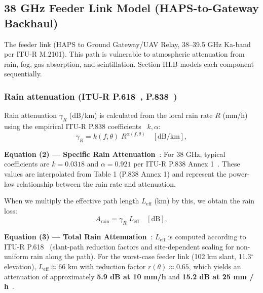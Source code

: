 \documentclass[conference]{IEEEtran}
\begin{document}
\subsection{38 GHz Feeder Link Model (HAPS-to-Gateway Backhaul)}

The feeder link (HAPS to Ground Gateway/UAV Relay, 38--39.5 GHz Ka-band per ITU-R M.2101). This path is vulnerable to atmospheric attenuation from rain, fog, gas absorption, and scintillation. Section III.B models each component sequentially.

\subsubsection{Rain attenuation (ITU-R P.618~\cite{itu_p618}, P.838~\cite{itu_p838})}
Rain attenuation $\gamma_R$ (dB/km) is calculated from the local rain
rate $R$ (mm/h) using the empirical ITU-R P.838 coefficients~\cite{itu_p838} $k,\alpha$:
\begin{equation}
\gamma_R = k(f,\theta) \; R^{\alpha(f,\theta)} \quad [\mathrm{dB/km}],
\label{eq:rain_spec_atten}
\end{equation}

\noindent\textbf{Equation (2) --- Specific Rain Attenuation~\cite{itu_p838}}: For 38 GHz, typical coefficients are $k=0.0318$ and $\alpha=0.921$ per ITU-R P.838 Annex 1~\cite{itu_p838}. These values are interpolated from Table 1 (P.838 Annex 1) and represent the power-law relationship between the rain rate and attenuation.

When we multiply the effective path length $L_\mathrm{eff}$ (km) by this, we
obtain the rain loss:
\begin{equation}
A_\mathrm{rain} = \gamma_R \; L_\mathrm{eff} \quad [\mathrm{dB}],
\label{eq:rain_loss}
\end{equation}


\noindent\textbf{Equation (3) --- Total Rain Attenuation~\cite{itu_p618}}: $L_\mathrm{eff}$ is computed according to ITU-R P.618~\cite{itu_p618} (slant-path reduction factors and
site-dependent scaling for non-uniform rain along the path). For the worst-case feeder link (102 km slant, 11.3$^\circ$ elevation),
$L_\mathrm{eff} \approx 66$ km with reduction factor $r(\theta) \approx 0.65$, which yields an attenuation of approximately \textbf{5.9 dB at 10 mm/h} and \textbf{15.2 dB at 25 mm / h}~\cite{itu_p618}.
\end{document}
